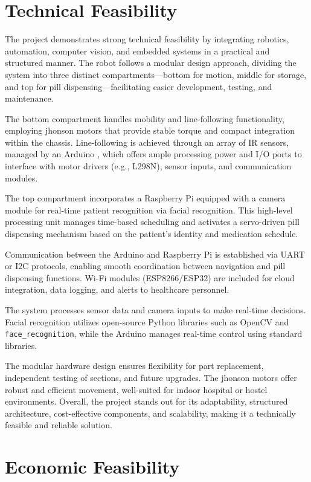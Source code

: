 \section{Technical Feasibility}

The project demonstrates strong technical feasibility by integrating robotics, automation, computer vision, and embedded systems in a practical and structured manner. The robot follows a modular design approach, dividing the system into three distinct compartments—bottom for motion, middle for storage, and top for pill dispensing—facilitating easier development, testing, and maintenance.

The bottom compartment handles mobility and line-following functionality, employing jhonson motors that provide stable torque and compact integration within the chassis. Line-following is achieved through an array of IR sensors, managed by an Arduino , which offers ample processing power and I/O ports to interface with motor drivers (e.g., L298N), sensor inputs, and communication modules.

The top compartment incorporates a Raspberry Pi equipped with a camera module for real-time patient recognition via facial recognition. This high-level processing unit manages time-based scheduling and activates a servo-driven pill dispensing mechanism based on the patient’s identity and medication schedule. 

Communication between the Arduino and Raspberry Pi is established via UART or I2C protocols, enabling smooth coordination between navigation and pill dispensing functions. Wi-Fi modules (ESP8266/ESP32) are included for cloud integration, data logging, and alerts to healthcare personnel.

The system processes sensor data and camera inputs to make real-time decisions. Facial recognition utilizes open-source Python libraries such as OpenCV and \texttt{face\_recognition}, while the Arduino manages real-time control using standard libraries.

The modular hardware design ensures flexibility for part replacement, independent testing of sections, and future upgrades. The jhonson motors offer robust and efficient movement, well-suited for indoor hospital or hostel environments. Overall, the project stands out for its adaptability, structured architecture, cost-effective components, and scalability, making it a technically feasible and reliable solution.

\section{Economic Feasibility}

